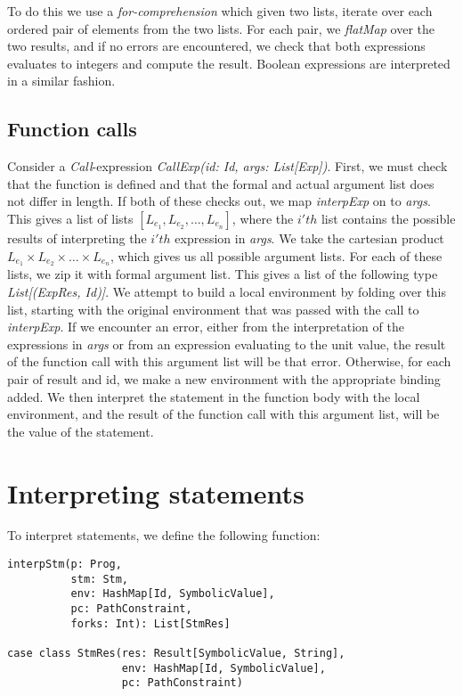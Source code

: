 To do this we use a \textsl{for-comprehension} which given two lists, iterate over each ordered pair of elements from the two lists.  For each pair, we \textsl{flatMap} over the two results, and if no errors are encountered, we check that both expressions evaluates to integers and compute the result.
Boolean expressions are interpreted in a similar fashion.

\subsection{Function calls}
Consider a \textsl{Call}-expression \textsl{CallExp(id: Id, args: List[Exp])}.
First, we must check that the function is defined and that the formal and actual argument list does not differ in length. If both of these checks out, we map \textsl{interpExp} on to \textsl{args}. This gives a list of lists $[L_{e_1}, L_{e_2}, \ldots, L_{e_n}]$, where the $i'th$ list contains the possible results of interpreting the $i'th$ expression in \textsl{args}.
We take the cartesian product $L_{e_1} \times L_{e_2} \times \ldots \times L_{e_n}$, which gives us all possible argument lists. For each of these lists, we zip it with formal argument list. This gives a list of the following type \textsl{List[(ExpRes, Id)]}. We attempt to build a local environment by folding over this list, starting with the original environment that was passed with the call to \textsl{interpExp}. If we encounter an error, either from the interpretation of the expressions in \textsl{args} or from an expression evaluating to the unit value, the result of the function call with this argument list will be that error. Otherwise, for each pair of result and id, we make a new environment with the appropriate binding added. We then interpret the statement in the function body  with the local environment, and the result of the function call with this argument list, will be the value of the statement.

\section{Interpreting statements}

To interpret statements, we define the following function:

\begin{lstlisting}[style=simple]
interpStm(p: Prog, 
		  stm: Stm, 
		  env: HashMap[Id, SymbolicValue], 
		  pc: PathConstraint,
		  forks: Int): List[StmRes]
			  
case class StmRes(res: Result[SymbolicValue, String], 
				  env: HashMap[Id, SymbolicValue], 
				  pc: PathConstraint)
\end{lstlisting}

